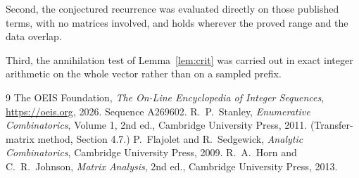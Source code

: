 \documentclass[11pt,a4paper]{article}
\theoremstyle{plain}
\theoremstyle{definition}
\begin{document}
Second, the conjectured recurrence was evaluated directly on those published terms, with no
matrices involved, and holds wherever the proved range and the data overlap.

Third, the annihilation test of Lemma~\ref{lem:crit} was carried out in exact integer
arithmetic on the whole vector rather than on a sampled prefix.

\begin{thebibliography}{9}
 The OEIS Foundation, \emph{The On-Line Encyclopedia of Integer
Sequences}, \url{https://oeis.org}, 2026. Sequence A269602.
 R.~P.~Stanley, \emph{Enumerative Combinatorics}, Volume 1, 2nd ed.,
Cambridge University Press, 2011. (Transfer-matrix method, Section 4.7.)
 P.~Flajolet and R.~Sedgewick, \emph{Analytic Combinatorics}, Cambridge
University Press, 2009.
 R.~A.~Horn and C.~R.~Johnson, \emph{Matrix Analysis}, 2nd ed., Cambridge
University Press, 2013.
\end{thebibliography}
\end{document}
